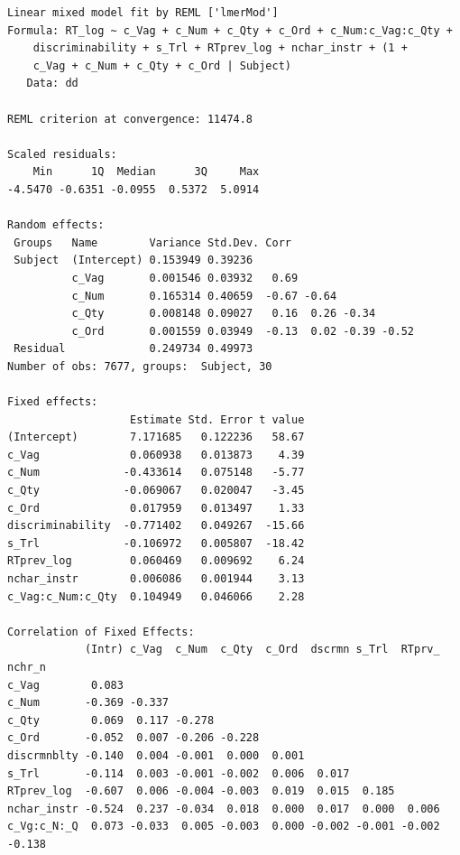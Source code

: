 \documentclass[a4paper,12pt,twoside]{article}\usepackage[]{graphicx}\usepackage[]{color}
\makeatletter
\newenvironment{kframe}{%
 \def\at@end@of@kframe{}%
 \ifinner\ifhmode%
  \def\at@end@of@kframe{\end{minipage}}%
  \begin{minipage}{\columnwidth}%
 \fi\fi%
 \def\FrameCommand##1{\hskip\@totalleftmargin \hskip-\fboxsep
 \colorbox{shadecolor}{##1}\hskip-\fboxsep
     \hskip-\linewidth \hskip-\@totalleftmargin \hskip\columnwidth}%
 \MakeFramed {\advance\hsize-\width
   \@totalleftmargin\z@ \linewidth\hsize
   \@setminipage}}%
 {\par\unskip\endMakeFramed%
 \at@end@of@kframe}
\newenvironment{knitrout}{}{} %
\makeatother
\begin{document}
\begin{knitrout}\scriptsize
{}\color{fgcolor}\begin{kframe}
\begin{verbatim}
Linear mixed model fit by REML ['lmerMod']
Formula: RT_log ~ c_Vag + c_Num + c_Qty + c_Ord + c_Num:c_Vag:c_Qty +  
    discriminability + s_Trl + RTprev_log + nchar_instr + (1 +  
    c_Vag + c_Num + c_Qty + c_Ord | Subject)
   Data: dd

REML criterion at convergence: 11474.8

Scaled residuals: 
    Min      1Q  Median      3Q     Max 
-4.5470 -0.6351 -0.0955  0.5372  5.0914 

Random effects:
 Groups   Name        Variance Std.Dev. Corr                   
 Subject  (Intercept) 0.153949 0.39236                         
          c_Vag       0.001546 0.03932   0.69                  
          c_Num       0.165314 0.40659  -0.67 -0.64            
          c_Qty       0.008148 0.09027   0.16  0.26 -0.34      
          c_Ord       0.001559 0.03949  -0.13  0.02 -0.39 -0.52
 Residual             0.249734 0.49973                         
Number of obs: 7677, groups:  Subject, 30

Fixed effects:
                   Estimate Std. Error t value
(Intercept)        7.171685   0.122236   58.67
c_Vag              0.060938   0.013873    4.39
c_Num             -0.433614   0.075148   -5.77
c_Qty             -0.069067   0.020047   -3.45
c_Ord              0.017959   0.013497    1.33
discriminability  -0.771402   0.049267  -15.66
s_Trl             -0.106972   0.005807  -18.42
RTprev_log         0.060469   0.009692    6.24
nchar_instr        0.006086   0.001944    3.13
c_Vag:c_Num:c_Qty  0.104949   0.046066    2.28

Correlation of Fixed Effects:
            (Intr) c_Vag  c_Num  c_Qty  c_Ord  dscrmn s_Trl  RTprv_ nchr_n
c_Vag        0.083                                                        
c_Num       -0.369 -0.337                                                 
c_Qty        0.069  0.117 -0.278                                          
c_Ord       -0.052  0.007 -0.206 -0.228                                   
discrmnblty -0.140  0.004 -0.001  0.000  0.001                            
s_Trl       -0.114  0.003 -0.001 -0.002  0.006  0.017                     
RTprev_log  -0.607  0.006 -0.004 -0.003  0.019  0.015  0.185              
nchar_instr -0.524  0.237 -0.034  0.018  0.000  0.017  0.000  0.006       
c_Vg:c_N:_Q  0.073 -0.033  0.005 -0.003  0.000 -0.002 -0.001 -0.002 -0.138
\end{verbatim}
\end{kframe}
\end{knitrout}
\end{document}
